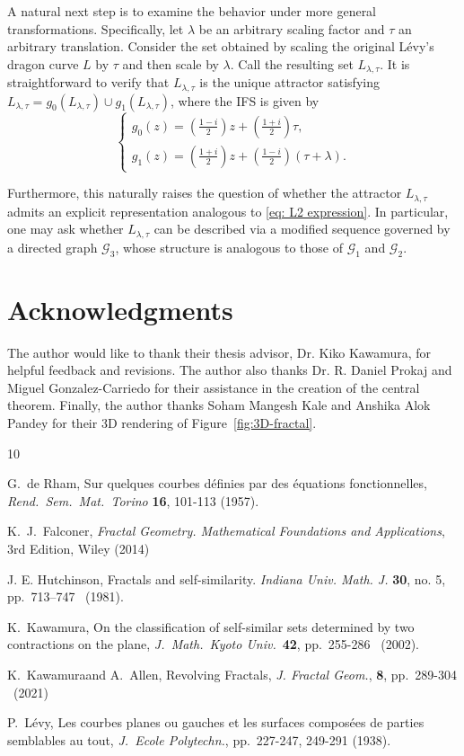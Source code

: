 \documentclass[epsf,10pt]{article}
\newcommand\GG{\mathcal{G}}
\begin{document}
A natural next step is to examine the behavior under more general transformations. Specifically, let $\lambda$ be an arbitrary scaling factor and $\tau$ an arbitrary translation. Consider the set obtained by scaling the original L\'evy's dragon curve $L$ 
by $\tau$ and then scale by $\lambda$. Call the resulting set $L_{\lambda,\tau}$. It is straightforward to verify that $L_{\lambda,\tau}$ is the unique attractor satisfying  $L_{\lambda,\tau}=g_0(L_{\lambda,\tau})\cup g_1(L_{\lambda,\tau})$, 
where the IFS is given by  
\begin{equation*}
\label{eq:general shifted levy}
\begin{cases}
 g_0(z)= (\frac{1-i}{2}) z + (\frac{1+i}{2})\tau, \\
 g_1(z)=(\frac{1+i}{2}) z+ (\frac{1-i}{2}) (\tau + \lambda).
\end{cases}
\end{equation*}

Furthermore, this naturally raises the question of whether the attractor $L_{\lambda,\tau}$ admits an explicit representation analogous to \eqref{eq: L2 expression}. In particular, one may ask whether $L_{\lambda,\tau}$ can be described via a modified sequence governed by a directed graph
$\GG_3$, whose structure is analogous to those of $\GG_1$ and $\GG_2$.

\section*{Acknowledgments}
The author would like to thank their thesis advisor, Dr. Kiko Kawamura, for helpful feedback and revisions. The author also thanks Dr. R. Daniel Prokaj and Miguel Gonzalez-Carriedo for their assistance in the creation of the central theorem. Finally, the author thanks Soham Mangesh Kale and Anshika Alok Pandey for their 3D rendering of Figure~\ref{fig:3D-fractal}. 

\begin{thebibliography}{10}

{\sc G.~de Rham}\@, Sur quelques courbes d\'efinies par des \'equations fonctionnelles, {\em Rend.\ Sem.\ Mat.\ Torino} {\bf 16}, 101-113 (1957).

{\sc K.~J.~Falconer}\@, {\it Fractal Geometry. Mathematical Foundations and Applications}, 3rd Edition, Wiley (2014)

{\sc J. E. Hutchinson}, Fractals and self-similarity. {\em Indiana Univ. Math. J.} {\bf 30}, no. 5, pp.~713--747 \ (1981).

{\sc K.~Kawamura}\@, On the classification of self-similar sets determined by two contractions on the plane, {\em J.\ Math.\ Kyoto Univ.}\ {\bf 42}, pp.~255-286 \ (2002).

{\sc K.~Kawamura}\@ and {\sc A.~Allen}\@,  Revolving Fractals, {\em J. Fractal Geom.}, {\bf 8}, pp.~289-304 \ (2021)

{\sc P.~L\'evy}\@, Les courbes planes ou gauches et les surfaces compos\'ees de parties semblables au tout, {\em J.\ Ecole Polytechn.}, pp.~227-247, 249-291 (1938).

\end{thebibliography}
\end{document}
